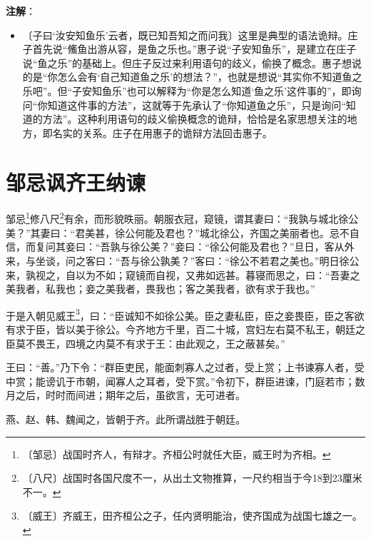 \documentclass[12pt,UTF-8,openany]{ctexbook}
\begin{document}
\textbf{注解}：

\vspace{-1em}

\begin{itemize}
    \setlength\itemsep{-0.2em}
    \item〔子曰‘汝安知鱼乐’云者，既已知吾知之而问我〕这里是典型的语法诡辩。庄子首先说“鯈鱼出游从容，是鱼之乐也。”惠子说“子安知鱼乐”，是建立在庄子说“鱼之乐”的基础上。但庄子反过来利用语句的歧义，偷换了概念。惠子想说的是“你怎么会有‘自己知道鱼之乐’的想法？”，也就是想说“其实你不知道鱼之乐吧”。但“子安知鱼乐”也可以解释为“你是怎么知道‘鱼之乐’这件事的”，即询问“你知道这件事的方法”，这就等于先承认了“你知道鱼之乐”，只是询问“知道的方法”。这种利用语句的歧义偷换概念的诡辩，恰恰是名家思想关注的地方，即名实的关系。庄子在用惠子的诡辩方法回击惠子。
\end{itemize}

\chapter{邹忌讽齐王纳谏}

\begin{normalsize}
    
    邹忌\footnote{〔邹忌〕战国时齐人，有辩才。齐桓公时就任大臣，威王时为齐相。}修八尺\footnote{〔八尺〕战国时各国尺度不一，从出土文物推算，一尺约相当于今18到23厘米不一。}有余，而形貌昳丽。朝服衣冠，窥镜，谓其妻曰：“我孰与城北徐公美？”其妻曰：“君美甚，徐公何能及君也？”城北徐公，齐国之美丽者也。忌不自信，而复问其妾曰：“吾孰与徐公美？”妾曰：“徐公何能及君也？”旦日，客从外来，与坐谈，问之客曰：“吾与徐公孰美？”客曰：“徐公不若君之美也。”明日徐公来，孰视之，自以为不如；窥镜而自视，又弗如远甚。暮寝而思之，曰：“吾妻之美我者，私我也；妾之美我者，畏我也；客之美我者，欲有求于我也。”
    
    于是入朝见威王\footnote{〔威王〕齐威王，田齐桓公之子，任内贤明能治，使齐国成为战国七雄之一。}，曰：“臣诚知不如徐公美。臣之妻私臣，臣之妾畏臣，臣之客欲有求于臣，皆以美于徐公。今齐地方千里，百二十城，宫妇左右莫不私王，朝廷之臣莫不畏王，四境之内莫不有求于王：由此观之，王之蔽甚矣。”
    
    王曰：“善。”乃下令：“群臣吏民，能面刺寡人之过者，受上赏；上书谏寡人者，受中赏；能谤讥于市朝，闻寡人之耳者，受下赏。”令初下，群臣进谏，门庭若市；数月之后，时时而间进；期年之后，虽欲言，无可进者。
    
    燕、赵、韩、魏闻之，皆朝于齐。此所谓战胜于朝廷。
\end{normalsize}


\newpage
\end{document}
